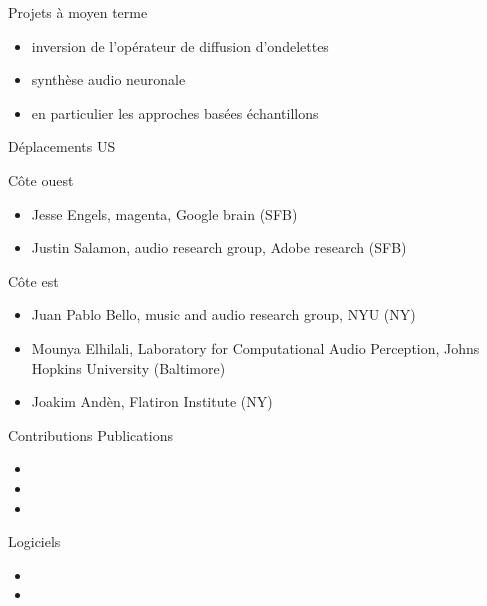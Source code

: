 \begin{frame}{Projets à moyen terme}
\begin{itemize}
\item inversion de l'opérateur de diffusion d'ondelettes
\item synthèse audio neuronale
\item en particulier les approches basées échantillons
\end{itemize}
\end{frame}

\begin{frame}{Déplacements US}
\begin{block}{Côte ouest}
\begin{itemize}
\item Jesse Engels, magenta, Google brain (SFB)
\item Justin Salamon, audio research group, Adobe research (SFB)
\end{itemize}
\end{block}
\begin{block}{Côte est}
\begin{itemize}
\item Juan Pablo Bello, music and audio research group, NYU (NY)
\item Mounya Elhilali, Laboratory for Computational Audio Perception, Johns Hopkins University (Baltimore)
\item Joakim Andèn, Flatiron Institute (NY)
\end{itemize}
\end{block}
\end{frame}

\begin{frame}{Contributions}
\small
Publications
\begin{itemize}
\item {}
\item {}
\item {}
\end{itemize}
Logiciels
\begin{itemize}
\item {}
\item {}
\end{itemize}
\end{frame}
